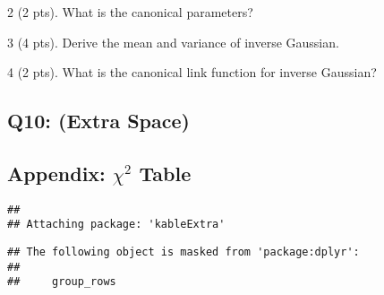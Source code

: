 \documentclass[
]{article}
\begin{document}
2 (2 pts). What is the canonical parameters?

3 (4 pts). Derive the mean and variance of inverse Gaussian.

4 (2 pts). What is the canonical link function for inverse Gaussian?

\newpage

\subsection{Q10: (Extra Space)}\label{q10-extra-space}

\newpage

\subsection{\texorpdfstring{Appendix: \(\chi^2\)
Table}{Appendix: \textbackslash chi\^{}2 Table}}\label{appendix-chi2-table}

\begin{verbatim}
## 
## Attaching package: 'kableExtra'
\end{verbatim}

\begin{verbatim}
## The following object is masked from 'package:dplyr':
## 
##     group_rows
\end{verbatim}
\end{document}
